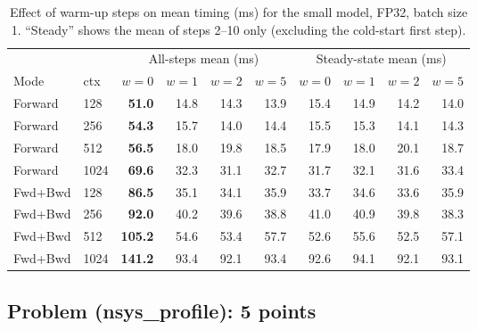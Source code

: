 \documentclass[letterpaper]{article}
\begin{document}
\begin{itemize}
		\begin{table}[h!]
			\centering
			\caption{Effect of warm-up steps on mean timing (ms) for the small model, FP32, batch size 1. ``Steady'' shows the mean of steps 2--10 only (excluding the cold-start first step).}
			\label{tab:warmup_comparison}
			\begin{tabular}{llrrrrrrrr}
				\hline
				& & \multicolumn{4}{c}{All-steps mean (ms)} & \multicolumn{4}{c}{Steady-state mean (ms)} \\
				Mode & ctx & $w{=}0$ & $w{=}1$ & $w{=}2$ & $w{=}5$ & $w{=}0$ & $w{=}1$ & $w{=}2$ & $w{=}5$ \\
				\hline
				Forward & 128  & \textbf{51.0}  & 14.8  & 14.3  & 13.9  & 15.4  & 14.9  & 14.2  & 14.0  \\
				Forward & 256  & \textbf{54.3}  & 15.7  & 14.0  & 14.4  & 15.5  & 15.3  & 14.1  & 14.3  \\
				Forward & 512  & \textbf{56.5}  & 18.0  & 19.8  & 18.5  & 17.9  & 18.0  & 20.1  & 18.7  \\
				Forward & 1024 & \textbf{69.6}  & 32.3  & 31.1  & 32.7  & 31.7  & 32.1  & 31.6  & 33.4  \\
				\hline
				Fwd+Bwd & 128  & \textbf{86.5}  & 35.1  & 34.1  & 35.9  & 33.7  & 34.6  & 33.6  & 35.9  \\
				Fwd+Bwd & 256  & \textbf{92.0}  & 40.2  & 39.6  & 38.8  & 41.0  & 40.9  & 39.8  & 38.3  \\
				Fwd+Bwd & 512  & \textbf{105.2} & 54.6  & 53.4  & 57.7  & 52.6  & 55.6  & 52.5  & 57.1  \\
				Fwd+Bwd & 1024 & \textbf{141.2} & 93.4  & 92.1  & 93.4  & 92.6  & 94.1  & 92.1  & 93.1  \\
				\hline
			\end{tabular}
		\end{table}
		
	\end{itemize}
	
	\subsection{Problem (nsys\_profile): 5 points}
	
\end{document}
